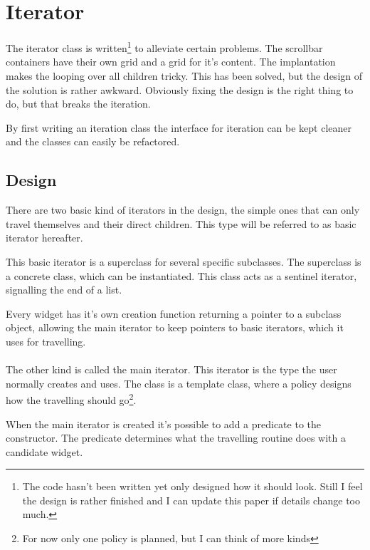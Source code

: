 \documentclass[a4paper,notitlepage,twocolumn,draft]{report}
\begin{document}
\section{Iterator}

The iterator class is written\footnote{The code hasn't been written yet only
designed how it should look. Still I feel the design is rather finished and I
can update this paper if details change too much.} to alleviate certain
problems. The scrollbar containers have their own grid and a grid for it's
content. The implantation makes the looping over all children tricky. This has
been solved, but the design of the solution is rather awkward. Obviously fixing
the design is the right thing to do, but that breaks the iteration.

By first writing an iteration class the interface for iteration can be kept
cleaner and the classes can easily be refactored.

\subsection{Design}

There are two basic kind of iterators in the design, the simple ones that can
only travel themselves and their direct children. This type will be referred to
as basic iterator hereafter. 

This basic iterator is a superclass for several specific subclasses. The
superclass is a concrete class, which can be instantiated. This class acts as a
sentinel iterator, signalling the end of a list.

Every widget has it's own creation function returning a pointer to a subclass
object, allowing the main iterator to keep pointers to basic iterators, which it
uses for travelling.

\paragraph{}

The other kind is called the main iterator. This iterator is the type the user
normally creates and uses. The class is a template class, where a policy designs
how the travelling should go\footnote{For now only one policy is planned, but I
can think of more kinds}.

When the main iterator is created it's possible to add a predicate to the
constructor. The predicate determines what the travelling routine does with a
candidate widget.
\end{document}
